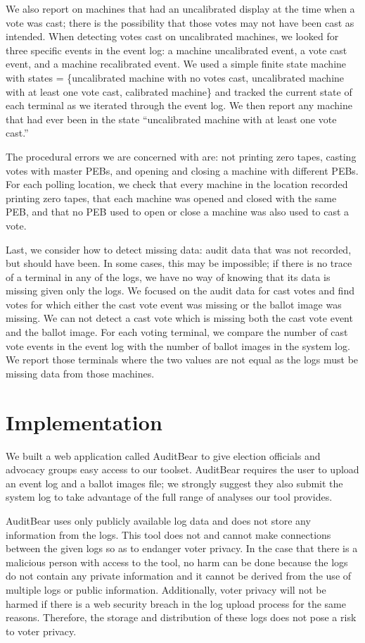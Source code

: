 \documentclass[letterpaper,twocolumn,10pt]{article}
\begin{document}
We also report on machines that had an uncalibrated display at the time when a
vote was cast; there is the possibility that those votes may not have been cast
as intended. When detecting votes cast on uncalibrated machines, we looked for
three specific events in the event log: a machine uncalibrated event, a vote
cast event, and a machine recalibrated event. We used a simple finite state
machine with states = \{uncalibrated machine with no votes cast, uncalibrated
  machine with at least one vote cast, calibrated machine\} and tracked the
current state of each terminal as we iterated through the event log. We then
report any machine that had ever been in the state ``uncalibrated machine with
at least one vote cast.'' 

The procedural errors we are concerned with are: not printing zero tapes,
casting votes with master PEBs, and opening and closing a machine with
different PEBs. For each polling location, we check that every machine in the
location recorded printing zero tapes, that each machine was opened and closed
with the same PEB, and that no PEB used to open or close a machine was also used
to cast a vote.  

Last, we consider how to detect missing data: audit data that was not recorded,
but should have been. In some cases, this may be impossible; if there is no
trace of a terminal in any of the logs, we have no way of knowing that its data
is missing given only the logs. We focused on the audit data for cast votes and
find votes for which either the cast vote event was missing or the ballot image
was missing. We can not detect a cast vote which is missing both the cast vote
event and the ballot image. For each voting terminal, we compare the number of
cast vote events in the event log with the number of ballot images in the system
log. We report those terminals where the two values are not equal as the logs
must be missing data from those machines.  

\section{Implementation}
We built a web application called AuditBear to give election officials and
advocacy groups easy access to our toolset. AuditBear requires the user to
upload an event log and a ballot images file; we strongly suggest they also
submit the system log to take advantage of the full range of analyses our tool
provides. 

AuditBear uses only publicly available log data and does not store
any information from the logs. This tool does not and cannot make connections 
between the given logs so as to endanger voter privacy. In the case that there 
is a malicious person with access to the tool, no harm can be done because the 
logs do not contain any private information and it cannot be derived from the 
use of multiple logs or public information.  Additionally, voter privacy will 
not be harmed if there is a web security breach in the log upload process for 
the same reasons.  Therefore, the storage and distribution of these logs does 
not pose a risk to voter privacy. 
\end{document}

